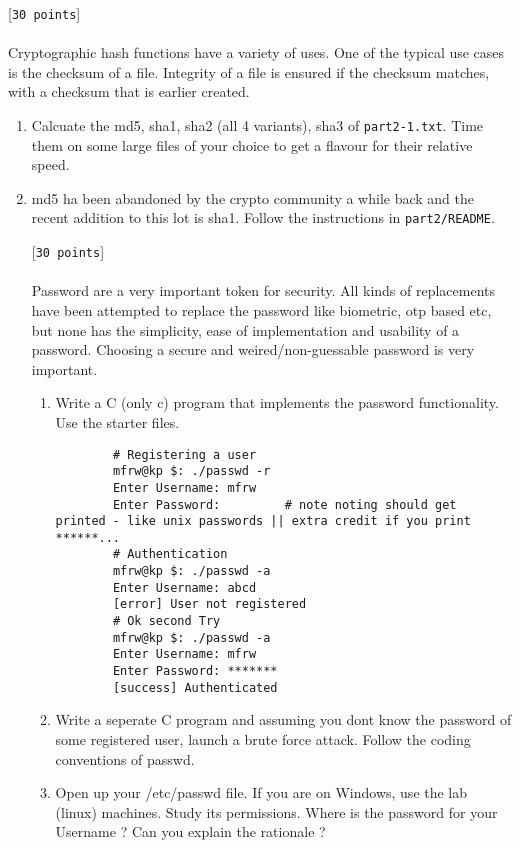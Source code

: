 \documentclass[11pt]{article}
\begin{document}
 [\texttt{30 points}] \\\\
Cryptographic hash functions have a variety of uses. One of the typical use cases is the checksum of a file. Integrity of a file is ensured if the checksum matches, with a checksum that is earlier created.
\begin{enumerate}
	\item Calcuate the md5, sha1, sha2 (all 4 variants), sha3 of \texttt{part2-1.txt}. Time them on some large files of your choice to get a flavour for their relative speed.
	\item md5 ha been abandoned by the crypto community a while back and the recent addition to this lot is sha1. Follow the instructions in \texttt{part2/README}.

\newpage
{} [\texttt{30 points}] \\\\
Password are a very important token for security. All kinds of replacements have been attempted to replace the password like biometric, otp based etc, but none has the
simplicity, ease of implementation and usability of a password. Choosing a secure and weired/non-guessable password is very important.

\begin{enumerate}
	\item { 
		Write a C (only c) program that implements the password functionality. Use the starter files.
		\begin{verbatim}
		# Registering a user
		mfrw@kp $: ./passwd -r
		Enter Username: mfrw
		Enter Password:         # note noting should get printed - like unix passwords || extra credit if you print ******...
		# Authentication
		mfrw@kp $: ./passwd -a
		Enter Username: abcd
		[error] User not registered
		# Ok second Try
		mfrw@kp $: ./passwd -a
		Enter Username: mfrw
		Enter Password: *******
		[success] Authenticated
		\end{verbatim}
		}



	\item Write a seperate C program and assuming you dont know the password of some registered user, launch a brute force attack. Follow the coding conventions of passwd.

	\item Open up your /etc/passwd file. If you are on Windows, use the lab (linux) machines. Study its permissions. Where is the password for your Username ? Can you explain the rationale ?
	

\end{enumerate}
\end{enumerate}
\end{document}
